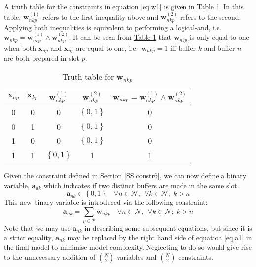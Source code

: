 A truth table for the constraints in 
\hyperref[eq.w1]{equation \ref*{eq.w1}} is given in
\hyperref[tbl.truthw]{Table \ref*{tbl.truthw}}.
In this table, $\boldsymbol{w}_{nkp}^{\left( 1 \right)}$ refers to the first
inequality above and $\boldsymbol{w}_{nkp}^{\left( 2 \right)}$ refers to the
second.
Applying both inequalities is equivalent to performing a logical-and, i.e.\
$\boldsymbol{w}_{nkp} = \boldsymbol{w}_{nkp}^{\left( 1 \right)} \land
\boldsymbol{w}_{nkp}^{\left( 2 \right)}$.
It can be seen from \hyperref[tbl.truthw]{Table \ref*{tbl.truthw}} that 
$\boldsymbol{w}_{nkp}$ is only equal to one when both $\boldsymbol{x}_{np}$ and
$\boldsymbol{x}_{np}$ are equal to one, i.e.\ $\boldsymbol{w}_{nkp} = 1$ iff
buffer $k$ and buffer $n$ are both prepared in slot $p$.
\begin{table}[h!]
    \centering
    \caption{Truth table for $\boldsymbol{w}_{nkp}$}
    \label{tbl.truthw}
    \begin{tabular}{c c | c c | c}
        $\boldsymbol{x}_{np}$ & $\boldsymbol{x}_{kp}$ &
        $\boldsymbol{w}_{nkp}^{\left( 1 \right)}$ &
        $\boldsymbol{w}_{nkp}^{\left( 2 \right)}$ &
        $\boldsymbol{w}_{nkp} = \boldsymbol{w}_{nkp}^{\left( 1 \right)}
            \land \boldsymbol{w}_{nkp}^{\left( 2 \right)}
        $\\ \hline
        0 & 0 & 0 & $\left\{ 0,1 \right\}$ & 0\\
        0 & 1 & 0 & $\left\{ 0,1 \right\}$ & 0\\
        1 & 0 & 0 & $\left\{ 0,1 \right\}$ & 0\\
        1 & 1 & $\left\{ 0,1 \right\}$ & 1 & 1\\
    \end{tabular}
\end{table}

Given the constraint defined in
\hyperref[SS.constr6]{Section \ref*{SS.constr6}}, we can now define a binary
variable, $\boldsymbol{a}_{nk}$ which indicates if two distinct buffers are
made in the same slot.
\begin{equation}
    \boldsymbol{a}_{nk} \in \left\{ 0, 1 \right\} \quad \forall n \in
    \mathcal{N}, \enspace \forall k \in \mathcal{N}; \; k > n
    \label{eq.a}
\end{equation}
This new binary variable is introduced via the following constraint:
\begin{equation}
    \boldsymbol{a}_{nk} = \sum_{p \in \mathcal{P}} \boldsymbol{w}_{nkp} \quad
    \forall n \in \mathcal{N}, \enspace \forall k \in \mathcal{N}; \; k > n
    \label{eq.a1}
\end{equation}
Note that we may use $\boldsymbol{a}_{nk}$ in describing some subsequent
equations, but since it is a strict equality, $\boldsymbol{a}_{nk}$ may be 
replaced by the right hand side of \hyperref[eq.a1]{equation \ref*{eq.a1}} in the
final model to minimise model complexity.
Neglecting to do so would give rise to the unnecessary addition of
$\binom{N}{2}$ variables and $\binom{N}{2}$ constraints.

